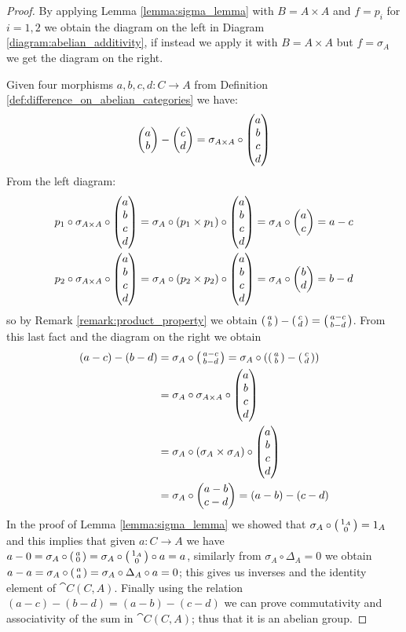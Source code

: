 \begin{proof}
  By applying Lemma \ref{lemma:sigma_lemma} with \(B = A\times A\) and \(f = p_i\) for \(i = 1,2\) we obtain the diagram on the left in Diagram \ref{diagram:abelian_additivity}, if instead we apply it with \(B=A\times A\) but \(f=\sigma_A\) we get the diagram on the right.

  Given four morphisms \(a,b,c,d\colon C\to A\) from Definition \ref{def:difference_on_abelian_categories} we have:
  \begin{gather*}
    \begin{pmatrix}a\\ b\end{pmatrix}-\begin{pmatrix}c\\ d\end{pmatrix} = \sigma_{A\times A}\circ\begin{pmatrix}a\\ b\\ c\\ d\end{pmatrix}
  \end{gather*}
  From the left diagram:
  \begin{gather*}
    p_1\circ\sigma_{A\times A}\circ\begin{pmatrix}a\\ b\\ c\\ d\end{pmatrix} = \sigma_A\circ(p_1\times p_1)\circ\begin{pmatrix}a\\ b\\ c\\ d\end{pmatrix} = \sigma_A\circ\begin{pmatrix}a\\ c\end{pmatrix} = a - c\\
    p_2\circ\sigma_{A\times A}\circ\begin{pmatrix}a\\ b\\ c\\ d\end{pmatrix} = \sigma_A\circ(p_2\times p_2)\circ\begin{pmatrix}a\\ b\\ c\\ d\end{pmatrix} = \sigma_A\circ\begin{pmatrix}b\\ d\end{pmatrix} = b - d
  \end{gather*}
  so by Remark \ref{remark:product_property} we obtain \(\left(\begin{smallmatrix}a\\ b\end{smallmatrix}\right)-\left(\begin{smallmatrix}c\\ d\end{smallmatrix}\right) = \left(\begin{smallmatrix}a - c\\ b - d\end{smallmatrix}\right)\). From this last fact and the diagram on the right we obtain
  \begin{align*}
    (a - c)-(b - d) &= \sigma_A\circ\left(\begin{smallmatrix}a - c\\ b - d\end{smallmatrix}\right) = \sigma_A\circ\left(\left(\begin{smallmatrix}a\\ b\end{smallmatrix}\right)-\left(\begin{smallmatrix}c\\ d\end{smallmatrix}\right)\right)\\
                        &= \sigma_A\circ\sigma_{A\times A}\circ\begin{pmatrix}a\\ b\\ c\\ d\end{pmatrix}\\
                        &= \sigma_A\circ(\sigma_A\times\sigma_A)\circ\begin{pmatrix}a\\ b\\ c\\ d\end{pmatrix}\\
                        &= \sigma_A\circ\begin{pmatrix}a - b\\ c - d\end{pmatrix} = (a - b)-(c - d)
  \end{align*}
  In the proof of Lemma \ref{lemma:sigma_lemma} we showed that \(\sigma_A\circ\left(\begin{smallmatrix}1_A\\ 0\end{smallmatrix}\right)=1_A\) and this implies that given \(a\colon C\to A\) we have \(a - 0 = \sigma_A\circ\left(\begin{smallmatrix}a\\ 0\end{smallmatrix}\right)=\sigma_A\circ\left(\begin{smallmatrix}1_A\\ 0\end{smallmatrix}\right)\circ a = a\), similarly from \(\sigma_A\circ\Delta_A = 0\) we obtain \(a - a =\sigma_A\circ\left(\begin{smallmatrix}a\\ a\end{smallmatrix}\right) = \sigma_A\circ\Delta_A\circ a = 0\); this gives us inverses and the identity element of \(\cat{C}(C, A)\). Finally using the relation \((a - c) - (b - d) = (a - b) - (c - d)\) we can prove commutativity and associativity of the sum in \(\cat{C}(C, A)\); thus that it is an abelian group.

\end{proof}
